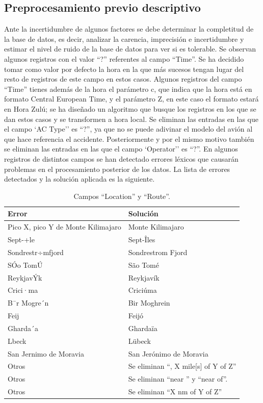 \documentclass[a4paper,10pt]{article}
\begin{document}
\subsection{Preprocesamiento previo descriptivo}
Ante la incertidumbre de algunos factores se debe determinar la completitud de la base de datos, es decir, analizar la carencia, imprecisi\'on e incertidumbre y estimar el nivel de ruido de la base de datos para ver si es tolerable.
\singlespacing
	Se observan algunos registros con el valor ``?'' referentes al campo ``Time''. Se ha decidido tomar como valor por defecto la hora en la que m\'as sucesos tengan lugar del resto de registros de este campo en estos casos. Algunos registros del campo ``Time'' tienes adem\'as de la hora el par\'ametro c, que indica que la hora est\'a en formato Central European Time, y el par\'ametro Z, en este caso el formato estar\'a en Hora Zul\'u; se ha dise\~nado un algoritmo que busque los registros en los que se dan estos casos y se transformen a hora local.
    \singlespacing
	Se eliminan las entradas en las que el campo `AC Type'' es ``?'', ya que no se puede adivinar el modelo del avi\'on al que hace referencia el accidente. Posteriormente y por el mismo motivo tambi\'en se eliminan las entradas en las que el campo `Operator'' es ``?''.
    \singlespacing
	En algunos registros de distintos campos se han detectado errores l\'exicos que causar\'an problemas en el procesamiento posterior de los datos. La lista de errores detectados y la soluci\'on aplicada es la siguiente.

\singlespacing
\begin{table}[htbp]
\centering
\begin{tabular}{p{5cm} p{7cm}}
\hline \hline
Error& Soluci\'on \\
\hline \hline
Pico X, pico Y de Monte Kilimajaro &Monte Kilimajaro\\
\hline
Sept-+le& Sept-\^Iles\\
\hline
Sondrestr÷mfjord& Sondrestrom Fjord\\
\hline
S\'Oo Tom\'U& S\~ao Tom\'e\\
\hline
Reykjav\'Yk& Reykjav\'ik\\
\hline
Crici·ma& Crici\'uma\\
\hline
B¯r Mogre´n& Bir Moghrein\\
\hline
Feij& Feij\'o\\
\hline
Gharda´a& Gharda\"ia\\
\hline
Lbeck&  L\"ubeck\\
\hline
San Jernimo de Moravia& San Jer\'onimo de Moravia\\
\hline \hline
Otros& Se eliminan ``, X mile[s] of Y of Z'' \\
\hline
Otros& Se eliminan ``near '' y ``near of''. \\
\hline
Otros& Se eliminan ``X nm of Y of Z''\\
\hline \hline

\end{tabular}
\caption{Campos ``Location'' y ``Route''.}
\label{tabla:autores}
\end{table}
\end{document}
